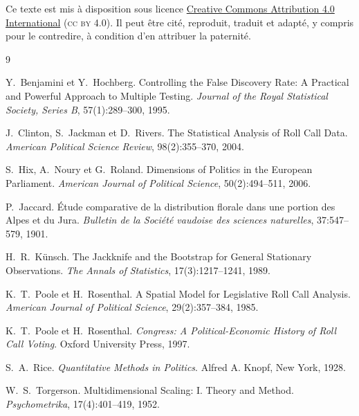 \documentclass[11pt,a4paper]{article}
\begin{document}
Ce texte est mis à disposition sous licence
\href{https://creativecommons.org/licenses/by/4.0/deed.fr}
     {Creative Commons Attribution 4.0 International} (\textsc{cc by} 4.0).
Il peut être cité, reproduit, traduit et adapté, y compris pour le contredire,
à condition d'en attribuer la paternité.

\begin{thebibliography}{9}

Y.~Benjamini et Y.~Hochberg.
\newblock Controlling the False Discovery Rate: A Practical and Powerful
  Approach to Multiple Testing.
\newblock \emph{Journal of the Royal Statistical Society, Series B},
  57(1):289--300, 1995.

J.~Clinton, S.~Jackman et D.~Rivers.
\newblock The Statistical Analysis of Roll Call Data.
\newblock \emph{American Political Science Review}, 98(2):355--370, 2004.

S.~Hix, A.~Noury et G.~Roland.
\newblock Dimensions of Politics in the European Parliament.
\newblock \emph{American Journal of Political Science}, 50(2):494--511, 2006.

P.~Jaccard.
\newblock Étude comparative de la distribution florale dans une portion des
  Alpes et du Jura.
\newblock \emph{Bulletin de la Société vaudoise des sciences naturelles},
  37:547--579, 1901.

H.~R.~Künsch.
\newblock The Jackknife and the Bootstrap for General Stationary Observations.
\newblock \emph{The Annals of Statistics}, 17(3):1217--1241, 1989.

K.~T.~Poole et H.~Rosenthal.
\newblock A Spatial Model for Legislative Roll Call Analysis.
\newblock \emph{American Journal of Political Science}, 29(2):357--384, 1985.

K.~T.~Poole et H.~Rosenthal.
\newblock \emph{Congress: A Political-Economic History of Roll Call Voting}.
\newblock Oxford University Press, 1997.

S.~A.~Rice.
\newblock \emph{Quantitative Methods in Politics}.
\newblock Alfred A. Knopf, New York, 1928.

W.~S.~Torgerson.
\newblock Multidimensional Scaling: I. Theory and Method.
\newblock \emph{Psychometrika}, 17(4):401--419, 1952.

\end{thebibliography}
\end{document}

